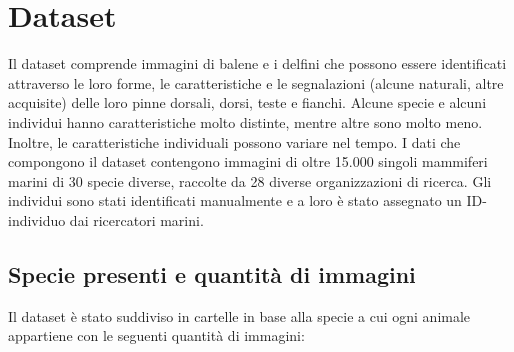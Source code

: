 \documentclass[a4paper,final,12pt]{report}
\begin{document}
\section{Dataset}
Il dataset comprende immagini di  balene e i delfini che possono essere identificati attraverso le loro forme, le caratteristiche e le segnalazioni (alcune naturali, altre acquisite) delle loro pinne dorsali, dorsi, teste e fianchi. Alcune specie e alcuni individui hanno caratteristiche molto distinte, mentre altre sono molto meno. Inoltre, le caratteristiche individuali possono variare nel tempo. I dati che compongono il dataset contengono immagini di oltre 15.000 singoli mammiferi marini di 30 specie diverse, raccolte da 28 diverse organizzazioni di ricerca. Gli individui sono stati identificati manualmente e a loro è stato assegnato un ID-individuo dai ricercatori marini.

\subsection{Specie presenti e quantità di immagini}
Il dataset è stato suddiviso in cartelle in base alla specie a cui ogni animale appartiene con le seguenti quantità di immagini:
\end{document}
